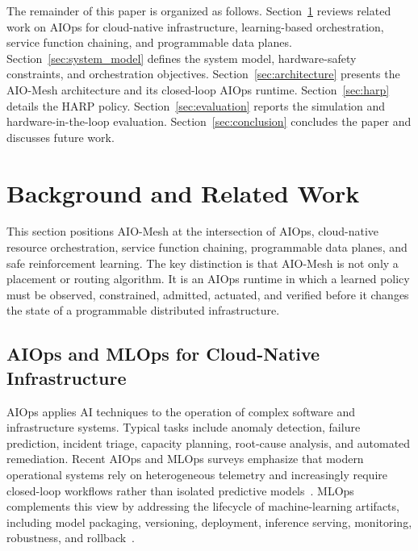 \documentclass[final,5p]{elsarticle}
\begin{document}
The remainder of this paper is organized as follows. Section~\ref{sec:related} reviews related work on AIOps for cloud-native infrastructure, learning-based orchestration, service function chaining, and programmable data planes. Section~\ref{sec:system_model} defines the system model, hardware-safety constraints, and orchestration objectives. Section~\ref{sec:architecture} presents the AIO-Mesh architecture and its closed-loop AIOps runtime. Section~\ref{sec:harp} details the HARP policy. Section~\ref{sec:evaluation} reports the simulation and hardware-in-the-loop evaluation. Section~\ref{sec:conclusion} concludes the paper and discusses future work.



\section{Background and Related Work}
\label{sec:related}

This section positions AIO-Mesh at the intersection of AIOps, cloud-native resource orchestration, service function chaining, programmable data planes, and safe reinforcement learning. The key distinction is that AIO-Mesh is not only a placement or routing algorithm. It is an AIOps runtime in which a learned policy must be observed, constrained, admitted, actuated, and verified before it changes the state of a programmable distributed infrastructure.

\subsection{AIOps and MLOps for Cloud-Native Infrastructure}
\label{subsec:related_aiops}

AIOps applies AI techniques to the operation of complex software and infrastructure systems. Typical tasks include anomaly detection, failure prediction, incident triage, capacity planning, root-cause analysis, and automated remediation. Recent AIOps and MLOps surveys emphasize that modern operational systems rely on heterogeneous telemetry and increasingly require closed-loop workflows rather than isolated predictive models~\cite{diazdearcaya2024joint,zhang2025aiopsllm}. MLOps complements this view by addressing the lifecycle of machine-learning artifacts, including model packaging, versioning, deployment, inference serving, monitoring, robustness, and rollback~\cite{kreuzberger2023mlops,eken2025mlops,bayram2025trustworthy}.
\end{document}
